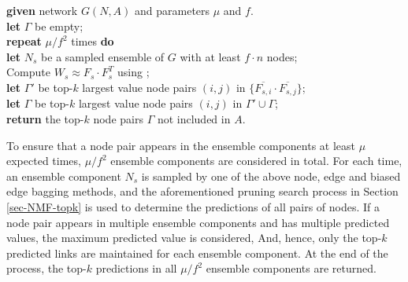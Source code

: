 \vspace{-1ex}
\begin{tabbing}\hspace{2ex}\=
 {\bf given} network $G(N, A)$ and parameters $\mu$ and $f$.\\
\> {\bf let} $\Gamma$ be empty;\\
\> {\bf repeat} $\mu/f^2$  times {\bf do} \\
\>\hspace{2ex}\= {\bf let} $N_s$ be a sampled ensemble of $G$ with at least $f\cdot n$ nodes; \\
\>\>Compute $W_s \approx F_s\cdot F_s^T$ using \NMF; \\
\>\> {\bf let} $\Gamma'$ be top-$k$ largest value node pairs $(i,j)$ in $\{\overline{F_{s,i}} \cdot \overline{F_{s,j}}\}$;\\
\>\> {\bf let} $\Gamma$ be top-$k$ largest value node pairs $(i,j)$ in $\Gamma'\cup\Gamma$;\\
\> {\bf return} the top-$k$ node pairs $\Gamma$ not included in $A$.
\end{tabbing}
\vspace{-1ex}


To ensure that a node pair appears in the ensemble components at least $\mu$ expected times,  $\mu / f^{2}$ ensemble components are considered in total.
For each time, an ensemble component $N_s$ is sampled by one of the above
node, edge and biased edge bagging methods,
and the aforementioned  
pruning search process in Section \ref{sec-NMF-topk} is used to determine the predictions of 
all pairs of nodes. If a node pair appears in multiple ensemble components and has multiple 
predicted values, the maximum predicted value is considered, 
And, hence, only the top-$k$ predicted links are maintained for each ensemble component.
At the end of the process, the top-$k$ predictions in all $\mu / f^{2}$ ensemble components are returned.




